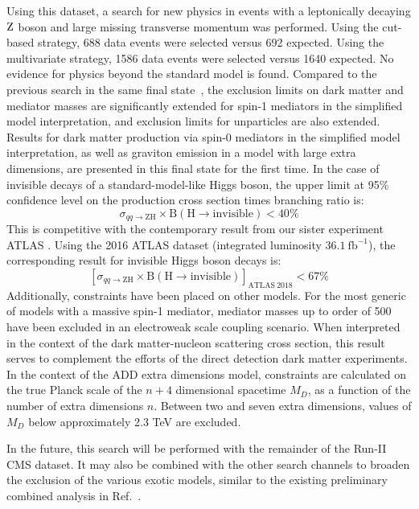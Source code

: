 Using this dataset, a search for new physics in events with a
leptonically decaying $\mathrm{Z}$ boson and large missing transverse momentum was performed.
Using the cut-based strategy, 688 data events were selected versus 692 expected.
Using the multivariate strategy, 1586 data events were selected versus 1640 expected. 
No evidence for physics beyond the standard model is found.
Compared to the previous search in the same final state~\cite{CMS-PAPER-EXO-16-010},
the exclusion limits on dark matter and mediator masses are significantly extended for spin-1 mediators in the simplified model interpretation, and exclusion limits for unparticles are also extended.
Results for dark matter production via spin-0 mediators in the simplified model interpretation,
as well as graviton emission in a model with large extra dimensions,
are presented in this final state for the first time.
\newpage
In the case of invisible decays of a standard-model-like Higgs boson,
the upper limit at 95\% confidence level on the production cross section times branching ratio is:
\begin{equation*}
\sigma_{qq\rightarrow\mathrm{ZH}} \times \mathrm{B(H \rightarrow invisible)} < 40\%
\end{equation*}
This is competitive with the contemporary result from our sister experiment ATLAS \cite{Aaboud:2017bja}.
Using the 2016 ATLAS dataset (integrated luminosity $36.1~\mathrm{fb}^{-1}$), 
the corresponding result for invisible Higgs boson decays is:
\begin{equation*}
\left[\sigma_{qq\rightarrow\mathrm{ZH}} \times \mathrm{B(H \rightarrow invisible)}\right]_\mathrm{ATLAS~2018} < 67\%
\end{equation*}
Additionally, constraints have been placed on other models.
For the most generic of models with a massive spin-1 mediator,
mediator masses up to order of 500 \GeV have been excluded in an electroweak scale coupling scenario.
When interpreted in the context of the dark matter-nucleon scattering cross section,
this result serves to complement the efforts of the direct detection dark matter experiments.
In the context of the ADD extra dimensions model, constraints are calculated on the true Planck scale of the $n+4$ dimensional spacetime $M_D$, as a function of the number of extra dimensions $n$.
Between two and seven extra dimensions, values of $M_D$ below approximately 2.3 TeV are excluded.

In the future, this search will be performed with the remainder of the Run-II CMS dataset.
It may also be combined with the other search channels to broaden the exclusion
of the various exotic models, similar to the existing preliminary combined analysis
in Ref.~\cite{CMS-PAPER-HIG-16-016}.


